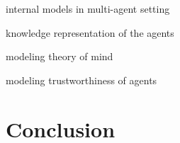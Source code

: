 \documentclass[11pt]{article}
\begin{document}
internal models in multi-agent setting \cite{nielsen:fusion-bn-mas}

knowledge representation of the agents \cite{bloemeke:agent-encapsulated-bn}
\cite{santos:cognitive-knowledge-representation}
\cite{martin:reasoning-action-bbn}

modeling theory of mind \cite{baker:bayesian-tom}
\cite{bello:cginitive-foundation-tom}

modeling trustworthiness of agents \cite{tan:trust-bbn}

\section{Conclusion}



\end{document}

